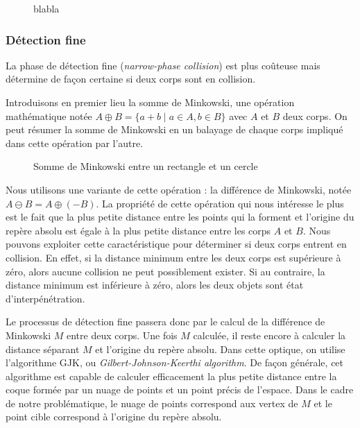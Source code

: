 \begin{figure}
  \centering
  \subfloat[]{  }
  \qquad
  \subfloat[]{  }
  \qquad
  \subfloat[]{  }
  \label{aabb}
  \caption{blabla}
\end{figure}

\subsubsection{Détection fine}

La phase de détection fine (\textit{narrow-phase collision}) est plus
coûteuse mais détermine de façon certaine si deux corps sont en
collision.

Introduisons en premier lieu la somme de Minkowski, une opération
mathématique notée $A \oplus B = \{a + b \mid a \in A, b \in B\}$ avec
$A$ et $B$ deux corps. On peut résumer la somme de Minkowski en un
balayage de chaque corps impliqué dans cette opération par l'autre.

\begin{figure}
  
  \caption{Somme de Minkowski entre un rectangle et un cercle}
\end{figure}

Nous utilisons une variante de cette opération : la différence de
Minkowski, notée $A \ominus B = A \oplus (-B)$. La propriété de cette
opération qui nous intéresse le plus est le fait que la plus petite
distance entre les points qui la forment et l'origine du repère absolu
est égale à la plus petite distance entre les corps $A$ et $B$. Nous
pouvons exploiter cette caractéristique pour déterminer si deux corps
entrent en collision. En effet, si la distance minimum entre les deux
corps est supérieure à zéro, alors aucune collision ne peut
possiblement exister. Si au contraire, la distance minimum est
inférieure à zéro, alors les deux objets sont état d'interpénétration.

Le processus de détection fine passera donc par le calcul de la
différence de Minkowski $M$ entre deux corps. Une fois $M$ calculée,
il reste encore à calculer la distance séparant $M$ et l'origine du
repère absolu. Dans cette optique, on utilise l'algorithme GJK, ou
\textit{Gilbert-Johnson-Keerthi algorithm}. De façon générale, cet
algorithme est capable de calculer efficacement la plus petite
distance entre la coque formée par un nuage de points et un point
précis de l'espace. Dans le cadre de notre problématique, le nuage de
points correspond aux vertex de $M$ et le point cible correspond à
l'origine du repère absolu.

